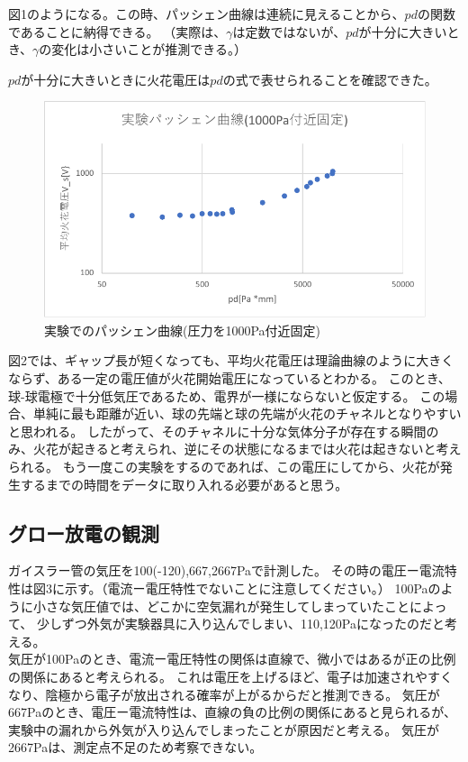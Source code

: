 \documentclass[a4j,twocolumn]{jsarticle}
\begin{document}
図1のようになる。この時、パッシェン曲線は連続に見えることから、$pd$の関数であることに納得できる。
（実際は、$\gamma$は定数ではないが、$pd$が十分に大きいとき、$\gamma$の変化は小さいことが推測できる。）

$pd$が十分に大きいときに火花電圧は$pd$の式で表せられることを確認できた。

\begin{figure}[htb]
    \centering
    \includegraphics[keepaspectratio,width=0.6\columnwidth]{fig/zu1.pdf}
    \caption{実験でのパッシェン曲線(圧力を1000Pa付近固定)}
\end{figure}

図2では、ギャップ長が短くなっても、平均火花電圧は理論曲線のように大きくならず、ある一定の電圧値が火花開始電圧になっているとわかる。
このとき、球-球電極で十分低気圧であるため、電界が一様にならないと仮定する。
この場合、単純に最も距離が近い、球の先端と球の先端が火花のチャネルとなりやすいと思われる。
したがって、そのチャネルに十分な気体分子が存在する瞬間のみ、火花が起きると考えられ、逆にその状態になるまでは火花は起きないと考えられる。
もう一度この実験をするのであれば、この電圧にしてから、火花が発生するまでの時間をデータに取り入れる必要があると思う。


\subsection*{グロー放電の観測}

ガイスラー管の気圧を100(-120),667,2667Paで計測した。
その時の電圧ー電流特性は図3に示す。（電流ー電圧特性でないことに注意してください。）
100Paのように小さな気圧値では、どこかに空気漏れが発生してしまっていたことによって、
少しずつ外気が実験器具に入り込んでしまい、110,120Paになったのだと考える。\\

気圧が100Paのとき、電流ー電圧特性の関係は直線で、微小ではあるが正の比例の関係にあると考えられる。
これは電圧を上げるほど、電子は加速されやすくなり、陰極から電子が放出される確率が上がるからだと推測できる。
気圧が667Paのとき、電圧ー電流特性は、直線の負の比例の関係にあると見られるが、実験中の漏れから外気が入り込んでしまったことが原因だと考える。
気圧が2667Paは、測定点不足のため考察できない。\\
\end{document}
